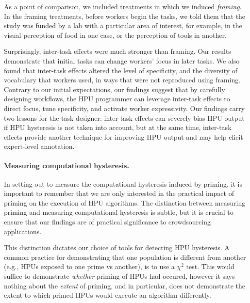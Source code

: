 \documentclass[12pt]{article}
\begin{document}
As a point of comparison, we included treatments in which we induced
\textit{framing}.
In the framing treatments, before workers begin the tasks, we told them that 
the study was funded by a lab with a particular area of interest, for example,
in the visual perception of food in one case, or the perception of tools in
another.

Surprisingly, inter-task effects were much stronger than framing.  
Our results demonstrate that initial tasks can change 
workers' focus in later tasks.  We also found that inter-task effects altered 
the level of specificity, and the diversity of vocabulary that workers used,
in ways that were not reproduced using framing.
Contrary to our initial expectations, our findings suggest that by carefully
designing workflows, the HPU programmer can leverage inter-task effects to
direct focus, tune specificity, and activate worker expressivity.  Our 
findings carry two lessons for the task designer: inter-task
effects can severely bias HPU output if HPU hysteresis is not taken into 
account, but at the same time, inter-task effects provide another technique
for improving HPU output and may help elicit expert-level annotation.

\paragraph*{Measuring computational hysteresis.}
In setting out to measure the computational hysteresis induced by priming, 
it is important to remember that we are only interested in the practical 
impact of priming on the execution of HPU algorithms.  
The distinction between measuring priming and measuring computational 
hysteresis is subtle, but it is crucial to ensure that our findings are of 
practical significance to crowdsourcing applications.  

This distinction dictates our choice of tools for detecting HPU hysteresis.
A common practice for demonstrating that one population is different from
another (e.g., HPUs exposed to one prime vs another), is to use a 
$\chi^2$ test. This would suffice to demonstrate \textit{whether} priming of 
HPUs had occured, however it says nothing about the \textit{extent} of 
priming, and in particular, does not demonstrate the extent to which primed 
HPUs would execute an algorithm differently.
\end{document}
